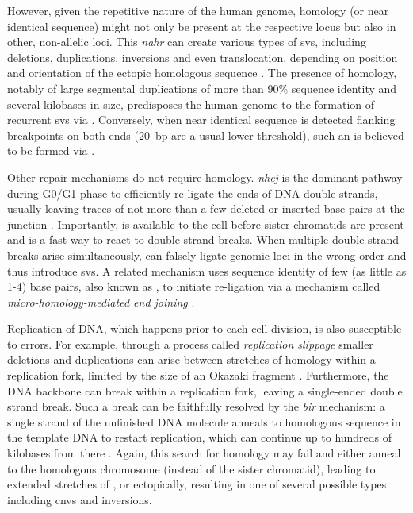 However, given the repetitive nature of
the human genome, homology (or near identical sequence) might not only be present at the
respective locus but also in other, non-allelic loci. This \emph{\acf{nahr}}
can create various types of \acp{sv}, including deletions, duplications,
inversions and even translocation, depending on position and orientation of the
ectopic homologous sequence \citep{Carvalho2016}. The presence of homology,
notably of large segmental duplications of more than 90\% sequence identity and
several kilobases in size, predisposes the human genome to the formation of
recurrent \acp{sv} via \nahr \citep{Carvalho2016}. Conversely, when
near identical sequence is detected flanking \sv breakpoints on both ends
(20~bp are a usual lower threshold), such an \sv is believed to be formed via
\nahr \citep{Onishi-Seebacher2011}.

Other repair mechanisms do not require homology. \emph{\Acf{nhej}} is the
dominant pathway during G0/G1-phase to efficiently re-ligate the ends of DNA
double strands, usually leaving traces of not more than a few deleted or
inserted base pairs at the junction \citep{Lieber2008}. Importantly, \nhej is
available to the cell before sister chromatids are present and is a fast way to
react to double strand breaks. When multiple double strand breaks arise
simultaneously, \nhej can falsely ligate genomic loci in the wrong order and
thus introduce \acp{sv}. A related mechanism uses sequence identity of few
(as little as 1-4) base pairs, also known as , to initiate re-ligation via a
mechanism called \emph{micro-homology-mediated end joining} \citep{Hastings2009}.

Replication of DNA, which happens prior to each cell division, is also
susceptible to errors. For example, through a process called \textit{replication
slippage} smaller deletions and duplications can arise between stretches of
homology within a replication fork, limited by the size of an Okazaki fragment
\citep{Hastings2009}. Furthermore, the DNA backbone can break within a
replication fork, leaving a single-ended double strand break. Such a break can
be faithfully resolved by the \emph{\acf{bir}} mechanism: a single strand of the
unfinished DNA molecule anneals to homologous sequence in the template DNA to
restart replication, which can continue up to hundreds of kilobases from there
\citep{Carvalho2016}. Again, this search for homology may fail and either anneal
to the homologous chromosome (instead of the sister chromatid), leading to
extended stretches of \loh, or ectopically, resulting in one of several possible
\sv types including \acp{cnv} and inversions.

